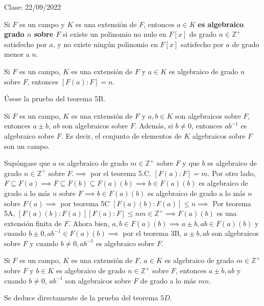 Clase: 22/09/2022


\begin{definicion}
    Si $F$ es un campo y $K$ es una extensión de $F$, entonces $a\in K$ \textbf{es algebraico grado $n$ sobre $F$} si existe un polinomio no nulo en $F[x]$ de grado $n\in \mathbb{Z}^+$ satisfecho por $a$, y no existe ningún polinomio en $F[x]$ satisfecho por $a$ de grado menor a $n$. 
\end{definicion}

\begin{teorema}[5C]
    Si $F$ es un campo, $K$ es una extensión de $F$ y $a\in K$ es algebraico de grado $n$ sobre $F$, entonces $[F(a):F]=n$.
    \begin{dem}
        Úsese la prueba del teorema 5B. 
    \end{dem}
\end{teorema}

\begin{teorema}[5D]
    Si $F$ es un campo, $K$ es una extensión de $F$ y $a,b\in K$ son algebraicos sobre $F$, entonces $a\pm b$, $ab$ son algebraicos  sobre $F$. Además, si $b\neq0$, entonces $ab^{-1}$ es algebraico sobre $F$. Es decir, el conjunto de elementos de $K$ algebraicos sobre $F$ son un campo. 
    \begin{dem}
        Supóngase que $a$ es algebraico de grado $m\in\mathbb{Z}^+$ sobre $F$ y que $b$ es algebraico de grado $n\in \mathbb{Z}^+$ sobre $F$.$\implies$ por el teorema 5.C. $[F(a):F]=m$. Por otro lado, $F\subseteq F(a)\implies F\subseteq F(b)\subseteq F(a)(b)\implies b\in F(a)(b)$ es algebraico de grado a lo más $n$ sobre $F\implies b\in F(a)(b)$ es algebraico de grado a lo más $n$ sobre $F(a)\implies$ por teorema 5C $[F(a)(b):F(a)]\leq n\implies$ Por teorema 5A, $[F(a)(b):F(a)][F(a):F]\leq nm\in \mathbb{Z}^+\implies F(a)(b)$ es una extensión finita de $F$. Ahora bien, $a,b\in F(a)(b)\implies a\pm b,ab\in F(a)(b)$ y cuando $b\pm 0, ab^{-1}\in F(a)(b)\implies$ por el teorema 3B, $a\pm b,ab$ son algebraicos sobre $F$ y cuando $b\neq 0,ab^{-1}$ es algebraico sobre $F$.
    \end{dem}
\end{teorema}

\begin{corolario}
    Si $F$ es un campo, $K$ es una extensión de $F$, $a\in K$ es algebraico de grado $m\in\mathbb{Z}^+$ sobre $F$ y $b\in K$ es algebraico de grado $n\in\mathbb{Z}^+$ sobre $F$, entonces $a\pm b,ab$ y cuando $b\neq0$, $ab^{-1}$ son algebraicos sobre $F$ de grado a lo más $mn$.
    \begin{dem}
        Se deduce directamente de la prueba del teorema $5D$. 
    \end{dem}
\end{corolario}

